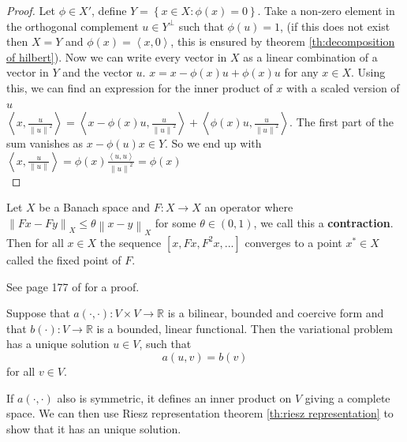 \documentclass[../Main/main.tex]{subfiles}
\begin{document}
	\begin{proof}
		Let $\phi \in X'$, define $Y = \left \{ x\in X:\phi (x)=0 \right \}$. Take a non-zero element in the orthogonal complement $u\in Y^{\bot}$ such that $\phi (u)=1$, (if this does not exist then $X=Y$ and $\phi (x) = \left \langle x, 0\right \rangle$, this is ensured by theorem \ref{th:decomposition of hilbert}). Now we can write every vector in $X$ as a linear combination of a vector in $Y$ and the vector $u$. $x = x-\phi (x) u + \phi(x) u$ for any $x \in X$. Using this, we can find an expression for the inner product of $x$ with a scaled version of $u$ \\
		$\left \langle x,\frac{u}{\left \| u \right \|^2} \right \rangle  = \left \langle x-\phi (x)u,\frac{u}{\left \| u \right \|^2} \right \rangle + \left \langle \phi (x)u,\frac{u}{\left \| u \right \|^2} \right \rangle $.
		The first part of the sum vanishes as $x - \phi (u)x \in Y$. So we end up with \\
		$\left \langle x,\frac{u}{\left \| u \right \|} \right \rangle  = \phi (x)\frac{\left \langle u,u\right \rangle}{\left \| u \right \|^2} = \phi (x)$ \\
	\end{proof}
	\begin{theorem}\label{th:Banach}
		Let $X$ be a Banach space and $F:X\rightarrow X$ an operator where $\left \|Fx-Fy\right \|_X\leq \theta \left \| x-y \right\|_X$ for some $\theta \in (0,1)$, we call this a \textbf{contraction}.\\
		Then for all $x \in X$ the sequence $[x,Fx,F^2x,...]$ converges to a point $x^* \in X$ called the fixed point of $F$.
	\end{theorem}
	See page 177 of \cite{Cheney} for a proof.
	\begin{theorem}\label{th:lax milgram}
		Suppose that $a(\cdot,\cdot):V \times V \rightarrow \mathbb{R}$ is a bilinear, bounded and coercive form and that $b(\cdot): V \rightarrow \mathbb{R}$ is a bounded, linear functional. Then the variational problem has a unique solution $u\in V$, such that
		\begin{equation}\label{eq:lax milgram}
			a(u,v)=b(v)
		\end{equation}
		for all $v \in V$.
	\end{theorem}
	\begin{remark}
		If $a(\cdot,\cdot)$ also is symmetric, it defines an inner product on $V$ giving a complete space. We can then use Riesz representation theorem \ref{th:riesz representation} to show that it has an unique solution.
	\end{remark}
\end{document}
